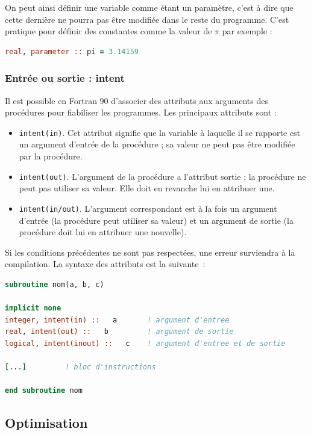 \documentclass[a4paper,twoside]{article}
\begin{document}
On peut ainsi définir une variable comme étant un paramètre, c'est à dire que cette dernière ne pourra pas être modifiée dans le reste du programme. C'est pratique pour définir des constantes comme la valeur de $\pi$ par exemple : 
\begin{lstlisting}[language=Fortran]
real, parameter :: pi = 3.14159
\end{lstlisting}

\subsubsection{Entrée ou sortie : intent}

Il est possible en Fortran 90 d'associer des attributs aux arguments des procédures pour fiabiliser les programmes. Les principaux attributs sont : 
\begin{itemize}
\item  \texttt{intent(in)}. Cet attribut signifie que la variable à laquelle il se rapporte est un argument d'entrée de la procédure ; sa valeur ne peut pas être modifiée par la procédure. 

\item  \texttt{intent(out)}. L'argument de la procédure a l'attribut sortie ; la procédure ne peut pas utiliser sa valeur. Elle doit en revanche lui en attribuer une.

\item  \texttt{intent(in/out)}. L'argument correspondant est à la fois un argument d'entrée (la procédure peut utiliser sa valeur) et un argument de sortie (la procédure doit lui en attribuer une nouvelle). 
\end{itemize}
Si les conditions précédentes ne sont pas respectées, une erreur surviendra à la compilation. La syntaxe des attributs est la suivante~: 
\begin{lstlisting}[language=Fortran]
subroutine nom(a, b, c)
 
implicit none         
integer, intent(in) ::   a       ! argument d'entree 
real, intent(out) ::   b         ! argument de sortie 
logical, intent(inout) ::   c    ! argument d'entree et de sortie
 
[...]         ! bloc d'instructions
 
end subroutine nom 
\end{lstlisting}


\subsection{Optimisation}
\end{document}
